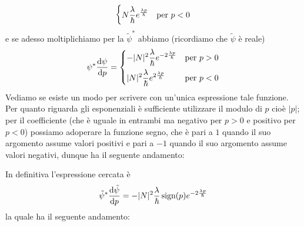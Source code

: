 \begin{soluzione}
\begin{equation*}
\begin{dcases}
         N\frac{\lambda}{\hbar}e^{\frac{\lambda p}{\hbar}} & \text{per } p<0
      \end{dcases}
   \end{equation*}
   e se adesso moltiplichiamo per la $\tilde{\psi}^*$ abbiamo (ricordiamo che $\tilde{\psi}$ è reale)
   \begin{equation*}
      \psi^*\dv{\psi}{p}=
      \begin{dcases}
         -|N|^2\frac{\lambda}{\hbar}e^{-2\frac{\lambda p}{\hbar}} & \text{per } p>0\\
         |N|^2\frac{\lambda}{\hbar}e^{2\frac{\lambda p}{\hbar}} & \text{per } p<0
      \end{dcases}
   \end{equation*}
   Vediamo se esiste un modo per scrivere con un'unica espressione tale funzione. Per quanto riguarda gli esponenziali è sufficiente utilizzare il modulo di $p$ cioè $|p|$; per il coefficiente (che è uguale in entrambi ma negativo per $p>0$ e positivo per $p<0$) possiamo adoperare la funzione segno, che è pari a $1$ quando il suo argomento assume valori positivi e pari a $-1$ quando il suo argomento assume valori negativi, dunque ha il seguente andamento:
   \begin{figure}[H]
      \centering
   \end{figure}
   In definitiva l'espressione cercata è
   \begin{equation*}
      \tilde{\psi}^*\dv{\tilde{\psi}}{p}=-|N|^2 \frac{\lambda}{\hbar} \, \text{sign}(p) e^{-2\frac{\lambda p}{\hbar}}
   \end{equation*}
   la quale ha il seguente andamento:
   \begin{figure}[H]
      \centering
   \end{figure}

\end{soluzione}
